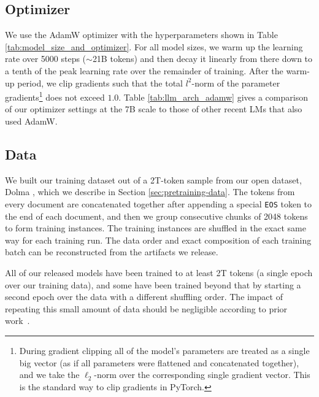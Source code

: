 \documentclass[11pt]{article}
\begin{document}
\subsection{Optimizer}
\label{sec:training-optimizer}

We use the AdamW optimizer \citep{loshchilov2018decoupled} with the hyperparameters shown in Table \ref{tab:model_size_and_optimizer}.
For all model sizes, we warm up the learning rate over 5000 steps ($\sim$21B tokens) and then decay it linearly from there down to a tenth of the peak learning rate over the remainder of training.
After the warm-up period, we clip gradients such that the total $l^2$-norm of the parameter gradients\footnote{During gradient clipping all of the model's parameters are treated as a single big vector (as if all parameters were flattened and concatenated together), and we take the $\ell_2$-norm over the corresponding single gradient vector. This is the standard way to clip gradients in PyTorch.} does not exceed $1.0$. Table \ref{tab:llm_arch_adamw} gives a comparison of our optimizer settings at the 7B scale to those of other recent LMs that also used AdamW.



\subsection{Data}
\label{sec:training-data}

We built our training dataset out of a 2T-token sample from our open dataset, Dolma \citep{dolma}, which we describe in Section \ref{sec:pretraining-data}.
The tokens from every document are concatenated together after appending a special \texttt{EOS} token to the end of each document, and then we group consecutive chunks of 2048 tokens to form training instances.
The training instances are shuffled in the exact same way for each training run.
The data order and exact composition of each training batch can be reconstructed from the artifacts we release.

All of our released models have been trained to at least 2T tokens (a single epoch over our training data), and some have been trained beyond that by starting a second epoch over the data with a different shuffling order. The impact of repeating this small amount of data should be negligible according to prior work~\citep{muennighoff2023scaling}.
\end{document}
